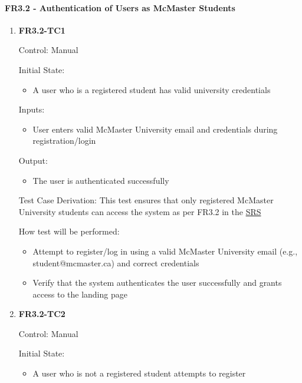 \documentclass[12pt, titlepage]{article}
\begin{document}
\paragraph{FR3.2 - Authentication of Users as McMaster Students}

\begin{enumerate}
    \item{\textbf{FR3.2-TC1}}
    
    Control: Manual
    
    Initial State:
    \begin{itemize}
        \item A user who is a registered student has valid university credentials
    \end{itemize}
    
    Inputs: 
    \begin{itemize}
        \item User enters valid McMaster University email and credentials during registration/login
    \end{itemize}
    
    Output: 
    \begin{itemize}
        \item The user is authenticated successfully
    \end{itemize}
    
    Test Case Derivation: This test ensures that only registered McMaster University students can access the system as per FR3.2 in the \href{https://shorturl.at/FdAgR}{SRS}
    
    How test will be performed:
    \begin{itemize}
        \item Attempt to register/log in using a valid McMaster University email (e.g., student@mcmaster.ca) and correct credentials
        \item Verify that the system authenticates the user successfully and grants access to the landing page
    \end{itemize}

    \item{\textbf{FR3.2-TC2}}
    
    Control: Manual
    
    Initial State:
    \begin{itemize}
        \item A user who is not a registered student attempts to register
    \end{itemize}
    

\end{enumerate}
\end{document}
